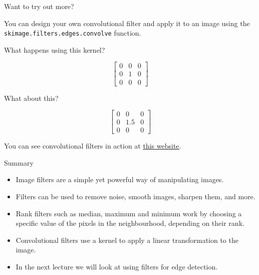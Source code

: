 \documentclass[9pt, aspectratio=169]{beamer}
\begin{document}
\begin{frame}
    {Want to try out more?}

    You can design your own convolutional filter and apply it to an image using the \texttt{skimage.filters.edges.convolve} function.

    What happens using this kernel?

    $$\begin{bmatrix}0 & 0 & 0 \\ 0 & 1 & 0 \\ 0 & 0 & 0\end{bmatrix}$$

    What about this?

    $$\begin{bmatrix}0 & 0 & 0 \\ 0 & 1.5 & 0 \\ 0 & 0 & 0\end{bmatrix}$$

    You can see convolutional filters in action at \href{https://setosa.io/ev/image-kernels/}{\underline{this website}}.
\end{frame}

\begin{frame}
    {Summary}
    \begin{itemize}
        \item Image filters are a simple yet powerful way of manipulating images.
        \item Filters can be used to remove noise, smooth images, sharpen them, and more.
        \item Rank filters such as median, maximum and minimum work by choosing a specific value of the pixels in the neighbourhood, depending on their rank.
        \item Convolutional filters use a kernel to apply a linear transformation to the image.
        \item In the next lecture we will look at using filters for edge detection.
    \end{itemize}


\end{frame}
\end{document}
